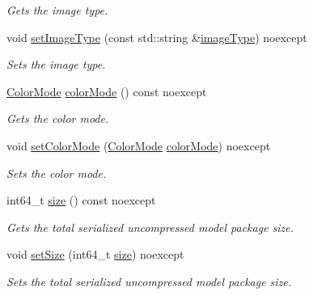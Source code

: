 \begin{DoxyCompactItemize}
\begin{DoxyCompactList}\small\item\em Gets the image type. \end{DoxyCompactList}\item 
void \hyperlink{group___classification_module_gaa2aa1b5aadc48ff8dea850aa061bcf2f}{set\+Image\+Type} (const std\+::string \&\hyperlink{group___classification_module_ga572f92d09d217ff3a0661fe9f6df4247}{image\+Type}) noexcept
\begin{DoxyCompactList}\small\item\em Sets the image type. \end{DoxyCompactList}\item 
\hyperlink{group___classification_module_gafa8e703c3646c5f93ada56f3c811aac7}{Color\+Mode} \hyperlink{group___classification_module_ga3ba94c7945195ba13d1698849926656f}{color\+Mode} () const noexcept
\begin{DoxyCompactList}\small\item\em Gets the color mode. \end{DoxyCompactList}\item 
void \hyperlink{group___classification_module_ga82fe704a35392f9a4a91469464e982c2}{set\+Color\+Mode} (\hyperlink{group___classification_module_gafa8e703c3646c5f93ada56f3c811aac7}{Color\+Mode} \hyperlink{group___classification_module_ga3ba94c7945195ba13d1698849926656f}{color\+Mode}) noexcept
\begin{DoxyCompactList}\small\item\em Sets the color mode. \end{DoxyCompactList}\item 
int64\+\_\+t \hyperlink{group___classification_module_gae7ab9c52670087042f53dfb8b6c26e0c}{size} () const noexcept
\begin{DoxyCompactList}\small\item\em Gets the total serialized uncompressed model package size. \end{DoxyCompactList}\item 
void \hyperlink{group___classification_module_ga7acb468cd6e0f06a423940720ae37a30}{set\+Size} (int64\+\_\+t \hyperlink{group___classification_module_gae7ab9c52670087042f53dfb8b6c26e0c}{size}) noexcept
\begin{DoxyCompactList}\small\item\em Sets the total serialized uncompressed model package size. \end{DoxyCompactList}\end{DoxyCompactItemize}
